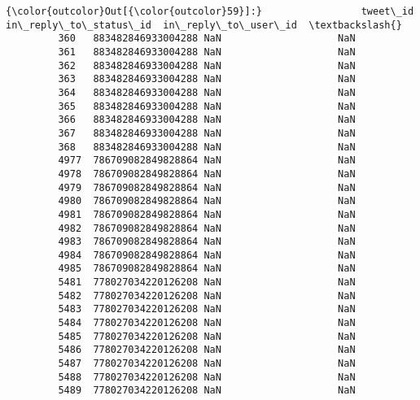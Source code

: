 \documentclass[11pt]{article}
\begin{document}
\begin{Verbatim}[commandchars=\\\{\}]
{\color{outcolor}Out[{\color{outcolor}59}]:}                 tweet\_id  in\_reply\_to\_status\_id  in\_reply\_to\_user\_id  \textbackslash{}
         360   883482846933004288 NaN                    NaN                    
         361   883482846933004288 NaN                    NaN                    
         362   883482846933004288 NaN                    NaN                    
         363   883482846933004288 NaN                    NaN                    
         364   883482846933004288 NaN                    NaN                    
         365   883482846933004288 NaN                    NaN                    
         366   883482846933004288 NaN                    NaN                    
         367   883482846933004288 NaN                    NaN                    
         368   883482846933004288 NaN                    NaN                    
         4977  786709082849828864 NaN                    NaN                    
         4978  786709082849828864 NaN                    NaN                    
         4979  786709082849828864 NaN                    NaN                    
         4980  786709082849828864 NaN                    NaN                    
         4981  786709082849828864 NaN                    NaN                    
         4982  786709082849828864 NaN                    NaN                    
         4983  786709082849828864 NaN                    NaN                    
         4984  786709082849828864 NaN                    NaN                    
         4985  786709082849828864 NaN                    NaN                    
         5481  778027034220126208 NaN                    NaN                    
         5482  778027034220126208 NaN                    NaN                    
         5483  778027034220126208 NaN                    NaN                    
         5484  778027034220126208 NaN                    NaN                    
         5485  778027034220126208 NaN                    NaN                    
         5486  778027034220126208 NaN                    NaN                    
         5487  778027034220126208 NaN                    NaN                    
         5488  778027034220126208 NaN                    NaN                    
         5489  778027034220126208 NaN                    NaN                    
         

\end{Verbatim}
\end{document}

